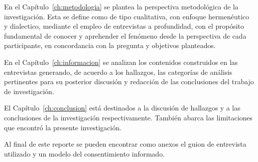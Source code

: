 En el Capítulo~\ref{ch:metodologia} se plantea la perspectiva metodológica de la
investigación. Esta se define como de tipo cualitativa, con enfoque hermenéutico
y dialectico, mediante el empleo de entrevistas a profundidad, con el
propósito fundamental de conocer y aprehender el fenómeno desde la perspectiva
de cada participante, en concordancia con la pregunta y objetivos planteados.

En el Capítulo~\ref{ch:informacion} se analizan los contenidos construidos en
las entrevistas generando, de acuerdo a los hallazgos, las categorías de
análisis pertinentes para su posterior discusión y redacción de las conclusiones
del trabajo de investigación.

El Capítulo~\ref{ch:conclusion} está destinados a la discusión de hallazgos y a
las conclusiones de la investigación respectivamente. También abarca las
limitaciones que encontró la presente investigación.

Al final de este reporte se pueden encontrar como anexos el
guion de entrevista utilizado y un modelo del consentimiento informado.
